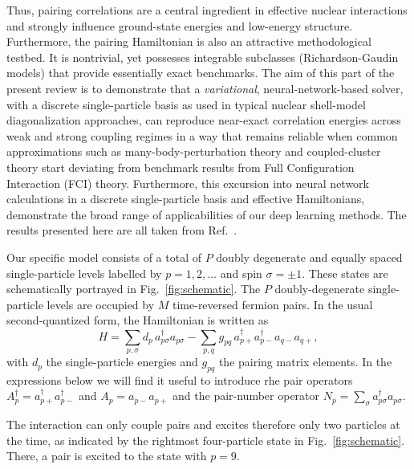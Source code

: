 Thus, pairing correlations are a central ingredient in effective nuclear
interactions and strongly influence ground-state energies and
low-energy structure. Furthermore, the pairing Hamiltonian is also an attractive
methodological testbed. It is nontrivial, yet possesses integrable
subclasses (Richardson-Gaudin models) \cite{Gaudin:1976} that provide essentially exact
benchmarks. The aim of this part of the present review is to
demonstrate that a \emph{variational}, neural-network-based solver,
with a discrete single-particle basis as used in typical nuclear
shell-model diagonalization approaches, can reproduce near-exact
correlation energies across weak and strong coupling regimes in a way
that remains reliable when common approximations such as
many-body-perturbation theory \cite{Paldus2006,shavittbartlett2009,morten_book} 
and coupled-cluster theory \cite{shavittbartlett2009,Hagen:2013nca} start
deviating from benchmark results from Full Configuration Interaction (FCI)
theory. Furthermore, this excursion into neural network calculations
in a discrete single-particle basis and effective Hamiltonians,
demonstrate the broad range of applicabilities of our deep learning
methods. The results presented here are all taken from Ref.~\cite{rigo2023}.



Our specific model consists of a total of $P$ doubly degenerate and equally spaced
single-particle levels labelled by $p=1,2,\dots$ and spin $\sigma=\pm
1$.  These states are schematically portrayed in
Fig.~\ref{fig:schematic}.  
The $P$ doubly-degenerate single-particle levels are occupied by $M$ time-reversed fermion pairs. In the usual
second-quantized form, the Hamiltonian is written as
\begin{equation}
H=\sum_{p,\sigma} d_p\, a_{p\sigma}^\dagger a_{p\sigma}
-\sum_{p,q} g_{pq}\, a_{p+}^\dagger a_{p-}^\dagger a_{q-} a_{q+},
\label{eq:H_full}
\end{equation}
with $d_p$ the single-particle energies and $g_{pq}$ the pairing matrix elements. 
In the expressions below we will find it useful to introduce rhe pair operators $A_p^\dagger=a_{p+}^\dagger a_{p-}^\dagger$ and $A_p=a_{p-}a_{p+}$ and the pair-number operator
$N_p=\sum_{\sigma}a_{p\sigma}^\dagger a_{p\sigma}$.



The interaction can only couple pairs and excites therefore only two
particles at the time, as indicated by the rightmost four-particle
state in Fig.~\ref{fig:schematic}. There, a pair is excited to the
state with $p=9$.   

